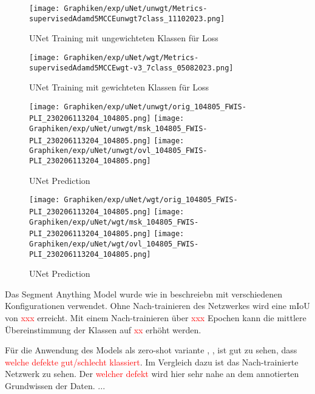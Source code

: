 \begin{figure}
    \centering
    \texttt{[image: Graphiken/exp/uNet/unwgt/Metrics-supervisedAdamd5MCCEunwgt7class\_11102023.png]}
    \caption{UNet Training mit ungewichteten Klassen für Loss }
    \label{fig:unwgt_Unet}
\end{figure}
\begin{figure}
    \centering
    \texttt{[image: Graphiken/exp/uNet/wgt/Metrics-supervisedAdamd5MCCEwgt-v3\_7class\_05082023.png]}
    \caption{UNet Training mit gewichteten Klassen für Loss }
    \label{fig:wgt_Unet}
\end{figure}
\begin{figure}
    \centering
    \texttt{[image: Graphiken/exp/uNet/unwgt/orig\_104805\_FWIS-PLI\_230206113204\_104805.png]}
    \texttt{[image: Graphiken/exp/uNet/unwgt/msk\_104805\_FWIS-PLI\_230206113204\_104805.png]}
    \texttt{[image: Graphiken/exp/uNet/unwgt/ovl\_104805\_FWIS-PLI\_230206113204\_104805.png]}
    \caption{UNet Prediction}
    \label{fig:unwgt_Unet_pred}
\end{figure}


\begin{figure}
    \centering
    \texttt{[image: Graphiken/exp/uNet/wgt/orig\_104805\_FWIS-PLI\_230206113204\_104805.png]}
    \texttt{[image: Graphiken/exp/uNet/wgt/msk\_104805\_FWIS-PLI\_230206113204\_104805.png]}
    \texttt{[image: Graphiken/exp/uNet/wgt/ovl\_104805\_FWIS-PLI\_230206113204\_104805.png]}
    \caption{UNet Prediction}
    \label{fig:wgt_Unet_pred}
\end{figure}





Das Segment Anything Model \cite{SAMKirillov2023} wurde wie in  beschreiebn mit verschiedenen Konfigurationen verwendet.
Ohne Nach-trainieren des Netzwerkes wird eine mIoU von \textcolor{red}{xxx} erreicht. Mit einem Nach-trainieren über \textcolor{red}{xxx} Epochen kann die mittlere Übereinstimmung der Klassen auf \textcolor{red}{xx} erhöht werden. 

Für die Anwendung des Models als zero-shot variante , , ist gut zu sehen, dass \textcolor{red}{ welche defekte gut/schlecht klassiert}. 
Im Vergleich dazu ist das Nach-trainierte Netzwerk zu sehen. Der \textcolor{red}{welcher defekt} wird hier sehr nahe an dem annotierten Grundwissen der Daten. ...
\fi



